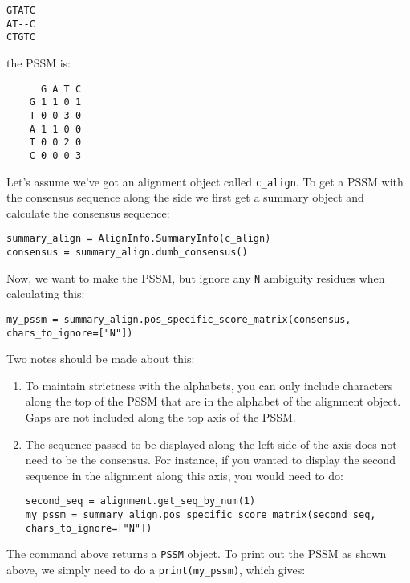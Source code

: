 \begin{verbatim}
GTATC
AT--C
CTGTC
\end{verbatim}

\noindent the PSSM is:

\begin{verbatim}
      G A T C
    G 1 1 0 1
    T 0 0 3 0
    A 1 1 0 0
    T 0 0 2 0
    C 0 0 0 3
\end{verbatim}

Let's assume we've got an alignment object called \verb|c_align|. To get a PSSM with the consensus sequence along the side we first get a summary object and calculate the consensus sequence:

\begin{verbatim}
summary_align = AlignInfo.SummaryInfo(c_align)
consensus = summary_align.dumb_consensus()
\end{verbatim}

Now, we want to make the PSSM, but ignore any \verb|N| ambiguity residues when calculating this:

\begin{verbatim}
my_pssm = summary_align.pos_specific_score_matrix(consensus, chars_to_ignore=["N"])
\end{verbatim}

Two notes should be made about this:

\begin{enumerate}
  \item To maintain strictness with the alphabets, you can only include characters along the top of the PSSM that are in the alphabet of the alignment object. Gaps are not included along the top axis of the PSSM.

  \item The sequence passed to be displayed along the left side of the axis does not need to be the consensus. For instance, if you wanted to display the second sequence in  the alignment along this axis, you would need to do:

\begin{verbatim}
second_seq = alignment.get_seq_by_num(1)
my_pssm = summary_align.pos_specific_score_matrix(second_seq, chars_to_ignore=["N"])
\end{verbatim}

\end{enumerate}

The command above returns a \verb|PSSM| object.
To print out the PSSM as shown above,
we simply need to do a \verb|print(my_pssm)|, which gives:

